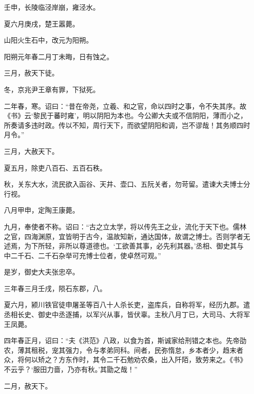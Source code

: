 \documentclass[12pt,UTF8]{ctexbook}
\begin{document}
壬申，长陵临泾岸崩，雍泾水。



夏六月庚戌，楚王嚣薨。



山阳火生石中，改元为阳朔。



阳朔元年春二月丁未晦，日有蚀之。



三月，赦天下徒。



冬，京兆尹王章有罪，下狱死。



二年春，寒。诏曰：“昔在帝尧，立羲、和之官，命以四时之事，令不失其序。故《书》云‘黎民于蕃时雍’，明以阴阳为本也。今公卿大夫或不信阴阳，薄而小之，所奏请多违时政。传以不知，周行天下，而欲望阴阳和调，岂不谬哉！其务顺四时月令。”



三月，大赦天下。



夏五月，除吏八百石、五百石秩。



秋，关东大水，流民欲入函谷、天井、壶口、五阮关者，勿苛留。遣谏大夫博士分行视。



八月甲申，定陶王康薨。



九月，奉使者不称。诏曰：“古之立太学，将以传先王之业，流化于天下也。儒林之官，四海渊原，宜皆明于古今，温故知新，通达国体，故谓之博士。否则学者无述焉，为下所轻，非所以尊道德也。‘工欲善其事，必先利其器。’丞相、御史其与中二千石、二千石杂举可充博士位者，使卓然可观。”



是岁，御史大夫张忠卒。



三年春三月壬戌，陨石东郡，八。



夏六月，颍川铁官徒申屠圣等百八十人杀长吏，盗库兵，自称将军，经历九郡。遣丞相长史、御史中丞逐捕，以军兴从事，皆伏辜。主秋八月丁已，大司马、大将军王凤薨。



四年春正月，诏曰：“夫《洪范》八政，以食为首，斯诚家给刑错之本也。先帝劭农，薄其租税，宠其强力，令与孝弟同科。间者，民弥惰怠，乡本者少，趋末者众，将何以矫之？方东作时，其令二千石勉劝农桑，出入阡陌，致劳来之。《书》不云乎？‘服田力啬，乃亦有秋。’其勖之哉！”



二月，赦天下。
\end{document}
